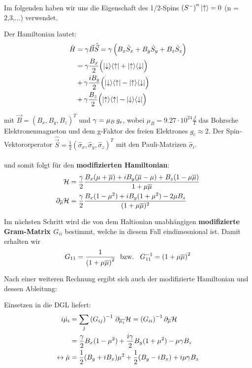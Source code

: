 \noindent Im folgenden haben wir uns die Eigenschaft des 1/2-Spins $\left(S^{-}\right)^{n}\ket{\uparrow}=0$  (n = 2,3,...) verwendet.

Der Hamiltonian lautet:
\begin{align}
    \hat{H} &= \gamma \vec{B}\hat{\vec{S}} = \gamma\left(B_x\hat{S}_x+B_y\hat{S}_y+B_z\hat{S}_z \right) \\
    &= \gamma \frac{B_x}{2}\Bigl(\ket{\downarrow}\!\bra{\uparrow}+\ket{\uparrow}\!\bra{\downarrow}\Bigr) \\
    & + \gamma \frac{iB_y}{2}\Bigl(\ket{\downarrow}\!\bra{\uparrow}-\ket{\uparrow}\!\bra{\downarrow}\Bigr) \\
    & + \gamma \frac{B_z}{2}\Bigl(\ket{\uparrow}\!\bra{\uparrow}-\ket{\downarrow}\!\bra{\downarrow}\Bigr) 
\end{align}

\noindent mit $\vec{B} = (B_x,B_y,B_z)^T$ und $\gamma=\mu_B\thinspace g_e$, wobei $\mu_B = 9.27 \cdot 10^{24} \frac{J}{T}$ das Bohrsche 
Elektronenmagneton und dem g-Faktor des freien Elektrones $g_e\approx 2$. Der Spin-Vektororperator 
$\hat{\vec{S}}= \frac{1}{2}\left(\hat{\sigma}_x,\hat{\sigma}_y,\hat{\sigma}_z\right)^T$ mit den Pauli-Matrizen $\hat{\sigma}_i$.\\ \\

und somit folgt für den \textbf{modifizierten Hamiltonian}:
\begin{align}
    \mathcal{H} &= \frac{\gamma}{2}\frac{B_x(\mu +\overline{\mu}) + iB_y(\overline{\mu} - \mu) + B_z(1-\mu\overline{\mu}) }{1+\mu\overline{\mu}}    \\
    \partial_{\overline{\mu}} \mathcal{H} &= \frac{\gamma}{2} \frac{B_x(1-\mu^2) + iB_y(1+\mu^2) - 2\mu B_z}{(1+\mu\overline{\mu})^2} 
\end{align}

\noindent Im nächsten Schritt wird die von dem Haltionian unabhängigen \textbf{modifizierte Gram-Matrix $G_{ii}$} bestimmt, 
welche in diesem Fall eindimesnional ist.
Damit erhalten wir
\begin{align}
    G_{11} = \frac{1}{\left(1 + \mu\overline{\mu}\right)^2} \text{\space\space bzw.\space\space } G_{11}^{-1} = \left(1 + \mu\overline{\mu}\right)^2
\end{align}

\noindent Nach einer weiteren Rechnung ergibt sich auch der modifizierte Hamiltonian und dessen Ableitung:

\noindent Einsetzen in die DGL liefert:
\begin{align*}
    i\dot{\mu_i} &= \sum_{j}\left(G_{ij}\right)^{-1}\thinspace \partial_{\overline{\mu_j}}\mathcal{H} = \left(G_{ii}\right)^{-1}\partial_{\overline{\mu}} \mathcal{H} \\
    &= \frac{\gamma}{2}B_x(1-\mu^2) + \frac{i\gamma}{2}B_y(1+\mu^2) -\mu \gamma B_z    \\
    \leftrightarrow \dot{\mu} &= \frac{1}{2}(B_y + iB_x)\mu^2 + \frac{1}{2}(B_y - iB_x) +i\mu \gamma B_z
\end{align*}

